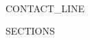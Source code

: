\documentclass[11pt,a4paper]{article}
\newcommand{\beforeheaderskip}{-15pt}
\newcommand{\normalfontsize}{\small}
\begin{document}
\vspace*{\beforeheaderskip}

\begin{center}
    {\normalfontsize\textbf{}} \\[2pt]
    {\footnotesize {{CONTACT_LINE}}}
\end{center}

\vspace{4pt}

{{SECTIONS}}
\end{document}
